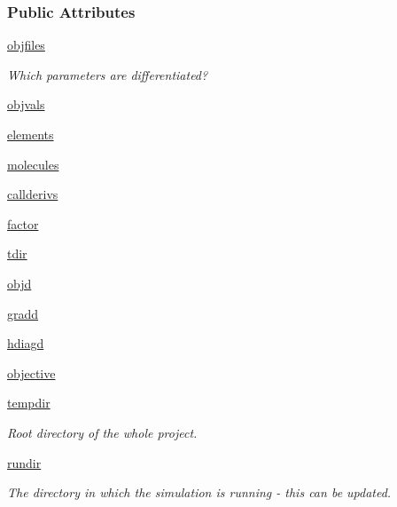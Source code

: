 \subsubsection*{Public Attributes}
\begin{DoxyCompactItemize}
\item 
\hyperlink{classforcebalance_1_1psi4io_1_1RDVR3__Psi4_adf77b8bc3f7d87d426e2bc539e2bc536}{objfiles}
\begin{DoxyCompactList}\small\item\em Which parameters are differentiated? \end{DoxyCompactList}\item 
\hyperlink{classforcebalance_1_1psi4io_1_1RDVR3__Psi4_a044c425337f42fa43a7d8a7010057ac8}{objvals}
\item 
\hyperlink{classforcebalance_1_1psi4io_1_1RDVR3__Psi4_af55d3d535249fb29e26f7fd236f6b08e}{elements}
\item 
\hyperlink{classforcebalance_1_1psi4io_1_1RDVR3__Psi4_ae0490cebed3a59e1989031dd63872d3c}{molecules}
\item 
\hyperlink{classforcebalance_1_1psi4io_1_1RDVR3__Psi4_aac0fda10840086df3d343c722addbb3c}{callderivs}
\item 
\hyperlink{classforcebalance_1_1psi4io_1_1RDVR3__Psi4_a032ae110d73b70f0a1fbb36b2332dfb2}{factor}
\item 
\hyperlink{classforcebalance_1_1psi4io_1_1RDVR3__Psi4_afba333b01de406679320bd268435fd94}{tdir}
\item 
\hyperlink{classforcebalance_1_1psi4io_1_1RDVR3__Psi4_a5e419082b7b8baf9cf55e4f6f272053e}{objd}
\item 
\hyperlink{classforcebalance_1_1psi4io_1_1RDVR3__Psi4_a914598ce5fac2ce75e305409e975d8be}{gradd}
\item 
\hyperlink{classforcebalance_1_1psi4io_1_1RDVR3__Psi4_a0faae382ff2a46e2fa9b843a2963a5b8}{hdiagd}
\item 
\hyperlink{classforcebalance_1_1psi4io_1_1RDVR3__Psi4_a17d4564604f719bcd7a6ffac59648cbe}{objective}
\item 
\hyperlink{classforcebalance_1_1target_1_1Target_aa1f01b5b78db253b5b66384ed11ed193}{tempdir}
\begin{DoxyCompactList}\small\item\em Root directory of the whole project. \end{DoxyCompactList}\item 
\hyperlink{classforcebalance_1_1target_1_1Target_a6872de5b2d4273b82336ea5b0da29c9e}{rundir}
\begin{DoxyCompactList}\small\item\em The directory in which the simulation is running -\/ this can be updated. \end{DoxyCompactList}\item 

\end{DoxyCompactItemize}
